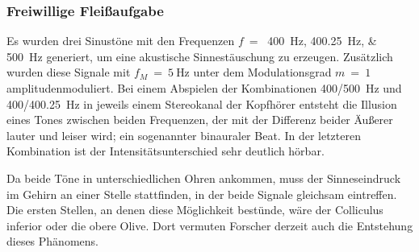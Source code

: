 \subsubsection{Freiwillige Fleißaufgabe}
Es wurden drei Sinustöne mit den Frequenzen $f\ =\ $ \SIlist[list-final-separator={ ,und }]{400;400.25;500}{\Hz} generiert, um eine akustische Sinnestäuschung zu erzeugen. Zusätzlich wurden diese Signale mit $f_M\ =\ \SI{5}{\Hz}$ unter dem Modulationsgrad $m\ =\ 1$ amplitudenmoduliert. Bei einem Abspielen der Kombinationen 400/\SI{500}{\Hz} und 400/\SI{400.25}{\Hz} in jeweils einem Stereokanal der Kopfhörer entsteht die Illusion eines Tones zwischen beiden Frequenzen, der mit der Differenz beider Äußerer lauter und leiser wird; ein sogenannter binauraler Beat. In der letzteren Kombination ist der Intensitätsunterschied sehr deutlich hörbar.

Da beide Töne in unterschiedlichen Ohren ankommen, muss der Sinneseindruck im Gehirn an einer Stelle stattfinden, in der beide Signale gleichsam eintreffen. Die ersten Stellen, an denen diese Möglichkeit bestünde, wäre der Colliculus inferior oder die obere Olive. Dort vermuten Forscher derzeit auch die Entstehung dieses Phänomens.




\clearpage
